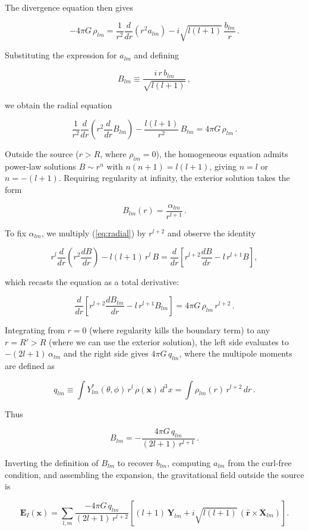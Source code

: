 \documentclass {article}
\renewcommand\vec{\mathbf}
\let\OldHat\hat
\renewcommand{\hat}[1]{\OldHat{\mathbf{#1}}}
\begin{document}
The divergence equation then gives

$$-4\pi G\,\rho_{lm} = \frac{1}{r^2}\frac{d}{dr}(r^2 a_{lm}) - i\sqrt{l(l+1)}\,\frac{b_{lm}}{r}\,.$$

Substituting the expression for $a_{lm}$ and defining

$$B_{lm} \equiv \frac{i\,r\,b_{lm}}{\sqrt{l(l+1)}}\,,$$

we obtain the radial equation

\begin{equation}\label{eq:radial}
\frac{1}{r^2}\frac{d}{dr}\!\left(r^2\frac{d}{dr}B_{lm}\right) - \frac{l(l+1)}{r^2}\,B_{lm} = 4\pi G\,\rho_{lm}\,.
\end{equation}

Outside the source ($r > R$, where $\rho_{lm} = 0$), the homogeneous equation admits power-law solutions $B \sim r^n$ with $n(n+1) = l(l+1)$, giving $n = l$ or $n = -(l+1)$. Requiring regularity at infinity, the exterior solution takes the form

$$B_{lm}(r) = \frac{\alpha_{lm}}{r^{l+1}}\,.$$

To fix $\alpha_{lm}$, we multiply (\ref{eq:radial}) by $r^{l+2}$ and observe the identity

$$r^l \frac{d}{dr}\!\left(r^2 \frac{dB}{dr}\right) - l(l+1)\,r^l\,B = \frac{d}{dr}\!\left[r^{l+2}\frac{dB}{dr} - l\,r^{l+1}B\right],$$

which recasts the equation as a total derivative:

$$\frac{d}{dr}\!\left[r^{l+2}\frac{dB_{lm}}{dr} - l\,r^{l+1}B_{lm}\right] = 4\pi G\,\rho_{lm}\,r^{l+2}\,.$$

Integrating from $r = 0$ (where regularity kills the boundary term) to any $r = R' > R$ (where we can use the exterior solution), the left side evaluates to $-(2l+1)\,\alpha_{lm}$ and the right side gives $4\pi G\,q_{lm}$, where the multipole moments are defined as

$$q_{lm} \equiv \int Y_{lm}^*(\theta,\phi)\,r^l\,\rho(\vec x)\,d^3x = \int \rho_{lm}(r)\,r^{l+2}\,dr\,.$$

Thus

$$B_{lm} = -\frac{4\pi G\,q_{lm}}{(2l+1)\,r^{l+1}}\,.$$

Inverting the definition of $B_{lm}$ to recover $b_{lm}$, computing $a_{lm}$ from the curl-free condition, and assembling the expansion, the gravitational field outside the source is

$$\vec{E}_I(\vec x) = \sum_{l,m}\frac{-4\pi G\,q_{lm}}{(2l+1)\,r^{l+2}}\left[(l+1)\,\vec{Y}_{lm} + i\sqrt{l(l+1)}\,(\hat r \times \vec{X}_{lm})\right].$$
\end{document}
